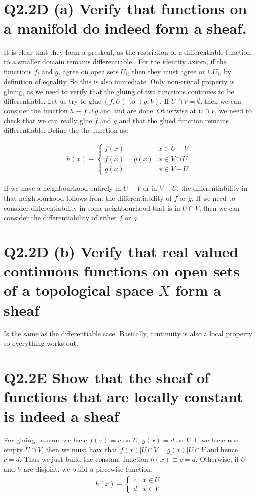 \documentclass{book}
\theoremstyle{definition}
\begin{document}
\section{Q2.2D (a) Verify that functions on a manifold do indeed form a sheaf.}
It is clear that they form a presheaf, as the restriction of a differentiable
function to a smaller domain remains differentiable.. For the identity axiom,
if the functions $f_i$ and $g_i$ agree on open sets $U_i$, then they must agree
on $\cup U_i$, by definition of equality. So this is also immediate. Only
non-trivial property is gluing, as we need to verify that the gluing of two
functions continues to be differentiable. Let us try to glue $(f, U)$  to $(g, V)$.
If $U \cap V = \emptyset$, then we can consider the function $h \equiv f \cup g$ and
and are done. Otherwise at $U \cap V$, we need to check that we can really glue
$f$ and $g$ and that the glued function remains differentiable. Define the
the function as:

\begin{align*}
    h(x) \equiv
    \begin{cases}
        f(x) & x \in U  - V  \\
        f(x) = g(x) & x \in V \cap U \\
        g(x) & x \in V - U
    \end{cases}
\end{align*}

If we have a neighbourhood entirely in $U-V$ or in $V-U$, the differentiability
in that neighbourhood follows from the differentiability of $f$ or $g$. If we
need to consider differentiability in some neighbourhood that is in $U \cap V$,
then we can consider the differentiability of either $f$ or $g$.

\section{Q2.2D (b) Verify that real valued continuous functions on open sets of a topological space $X$ form a sheaf}
Is the same as the differentiable case. Basically, continuity is also a local
property so everything works out.

\section{Q2.2E Show that the sheaf of functions that are locally constant is indeed a sheaf}
For gluing, assume we have $f(x) = c$ on $U$, $g(x) = d$ on $V$. If we have
non-empty $U \cap V$, then we must have that $f(x)|U\cap V = g(x)|U \cap V$
and hence $c = d$. Thus we just build the constant function $h(x) \equiv c = d$.
Otherwise, if $U$ and $V$ are disjoint, we build a piecewise function:
\begin{align*}
    h(x) \equiv \begin{cases} c & x \in U \\ d & x \in V \end{cases}
\end{align*}
\end{document}
